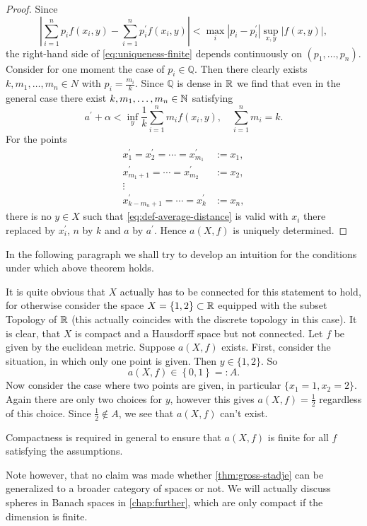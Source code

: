 \begin{proof}
	Since
	\[
	\left|\sum_{i=1}^n p_if(x_i,y)-\sum_{i=1}^np_i^\prime f(x_i,y)\right|<\max_i |p_i-p_i^\prime|\sup_{x,y}|f(x,y)|,
	\]
	the right-hand side of \autoref{eq:uniqueness-finite} depends continuously on $(p_1,\dots,p_n)$.
	Consider for one moment the case of $p_i\in \mathbb{Q}$. Then there clearly exists $k,m_1,\dots,m_n\in N$ with $p_i=\frac{m_i}{k}$. Since $\mathbb{Q}$ is dense in $\mathbb{R}$ we find that even in the general case there exist $k, m_1,\dots,m_n\in \mathbb{N}$ satisfying
	\begin{equation}
		a^\prime +\alpha<\inf_y\frac{1}{k}\sum_{i=1}^{n}m_if(x_i,y),\quad \sum_{i=1}^nm_i=k.
	\end{equation}
	For the points
	\begin{align*}
	x_1^\prime=x_2^\prime=\cdots=x_{m_1}^\prime&:=x_1,
	\\
	x_{m_1+1}^\prime=\cdots=x_{m_2}^\prime&:=x_2,
	\\
	\vdots
	\\
	x_{k-m_n+1}^\prime=\cdots =x^\prime_k&:=x_n,
	\end{align*}
	there is no $y\in X$ such that \eqref{eq:def-average-distance} is valid with $x_i$ there replaced by $x_i^\prime$, $n$ by $k$ and $a$ by $a^\prime$. Hence $a(X,f)$ is uniquely determined.
\end{proof}


In the following paragraph we shall try to develop an intuition for the conditions under which above theorem holds.

It is quite obvious that $X$ actually has to be connected for this statement to hold, for otherwise consider the space $X=\{1,2\}\subset\mathbb{R}$ equipped with the subset Topology of $\mathbb{R}$ (this actually coincides with the discrete topology in this case). It is clear, that $X$ is compact and a Hausdorff space but not connected. Let $f$ be given by the euclidean metric.
Suppose $a(X,f)$ exists.
First, consider the situation, in which only one point is given. Then $y\in\{1,2\}$. So \[a(X,f)\in\left\{0,1\right\}=:A.\] Now consider the case where two points are given, in particular $\{x_1=1,x_2=2\}$. Again there are only two choices for $y$, however this gives $a(X,f)=\frac{1}{2}$ regardless of this choice. Since $\frac{1}{2}\not\in A$, we see that $a(X,f)$ can't exist.

Compactness is required in general to ensure that $a(X,f)$ is finite for all $f$ satisfying the assumptions.


Note however, that no claim was made whether \autoref{thm:gross-stadje} can be generalized to a broader category of spaces or not. We will actually discuss spheres in Banach spaces in \autoref{chap:further}, which are only compact if the dimension is finite.


